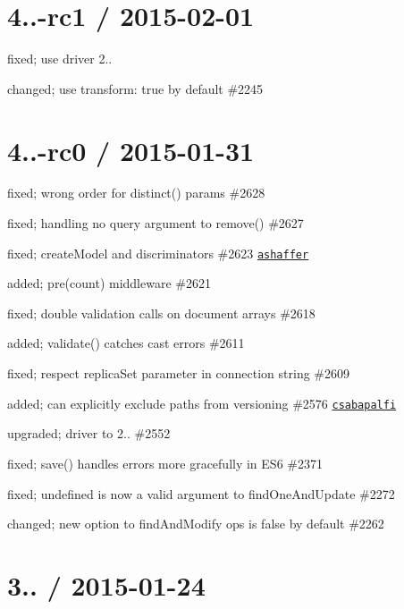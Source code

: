 \section*{4..-\/rc1 / 2015-\/02-\/01 }


\begin{DoxyItemize}
\item fixed; use driver 2..
\item changed; use transform\+: true by default \#2245
\end{DoxyItemize}

\section*{4..-\/rc0 / 2015-\/01-\/31 }


\begin{DoxyItemize}
\item fixed; wrong order for distinct() params \#2628
\item fixed; handling no query argument to remove() \#2627
\item fixed; create\+Model and discriminators \#2623 \href{https://github.com/ashaffer}{\tt ashaffer}
\item added; pre(\textquotesingle{}count\textquotesingle{}) middleware \#2621
\item fixed; double validation calls on document arrays \#2618
\item added; validate() catches cast errors \#2611
\item fixed; respect replica\+Set parameter in connection string \#2609
\item added; can explicitly exclude paths from versioning \#2576 \href{https://github.com/csabapalfi}{\tt csabapalfi}
\item upgraded; driver to 2.. \#2552
\item fixed; save() handles errors more gracefully in E\+S6 \#2371
\item fixed; undefined is now a valid argument to find\+One\+And\+Update \#2272
\item changed; {\ttfamily new} option to find\+And\+Modify ops is false by default \#2262
\end{DoxyItemize}

\section*{3.. / 2015-\/01-\/24 }


